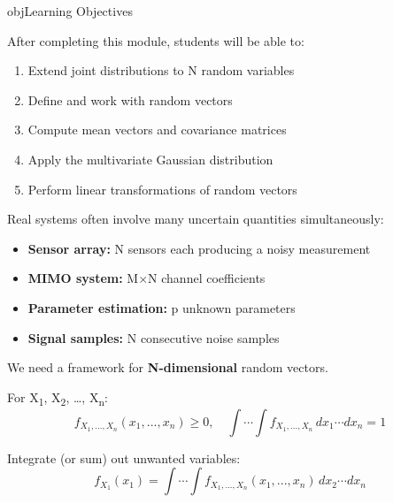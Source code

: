 \begin{PSbox}[unbreakable]{obj}{Learning Objectives}

After completing this module, students will be able to:

\begin{enumerate}
\def\labelenumi{\arabic{enumi}.}
\tightlist
\item
  Extend joint distributions to N random variables
\item
  Define and work with random vectors
\item
  Compute mean vectors and covariance matrices
\item
  Apply the multivariate Gaussian distribution
\item
  Perform linear transformations of random vectors
\end{enumerate}

\end{PSbox}


Real systems often involve many uncertain quantities simultaneously:

\begin{itemize}
\tightlist
\item
  \textbf{Sensor array:} N sensors each producing a noisy measurement
\item
  \textbf{MIMO system:} M\ensuremath{\times}N channel coefficients
\item
  \textbf{Parameter estimation:} p unknown parameters
\item
  \textbf{Signal samples:} N consecutive noise samples
\end{itemize}

We need a framework for \textbf{N-dimensional} random vectors.



For X\textsubscript{1}, X\textsubscript{2}, …, X\textsubscript{n}:\PSbr{}\[f_{X_1,...,X_n}(x_1,...,x_n) \geq 0, \quad \int\cdots\int f_{X_1,...,X_n} \, dx_1 \cdots dx_n = 1\]


Integrate (or sum) out unwanted variables:\PSbr{}\[f_{X_1}(x_1) = \int\cdots\int f_{X_1,...,X_n}(x_1,...,x_n) \, dx_2 \cdots dx_n\]


